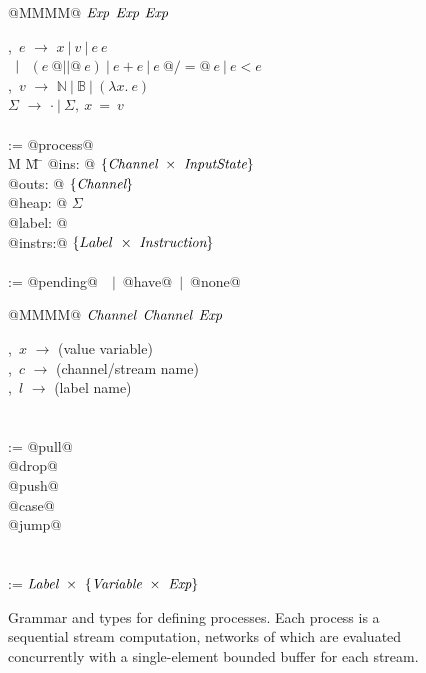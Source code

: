 
\begin{figure}
\begin{minipage}[t]{0.4\textwidth}
\begin{tabbing}
\Instr \TABDEF @MMMM@  \TABSKIP $\textit{Exp}$ \TABSKIP $\textit{Exp}$ \TABSKIP $\textit{Exp}$ \kill

\Exp,~$e$ \> $\to$ \> $x~|~v~|~e~e $ \\
  \> $\enskip|~$ \> $ (e~@||@~e) ~|~ e+e ~|~ e~@/=@~e ~|~ e < e$ \\
\Value,~$v$ \> $\to$ \> $\mathbb{N}~|~\mathbb{B}~|~(\lambda{}x.~e)$ \\
$\Sigma$ \> $\to$ \> $\cdot~|~\Sigma,~x~=~v$ \\
\\

\Proc \>:=\> @process@ \\
M \= M \= \kill
\> \> @ins:   @  $\{\textit{Channel} ~\times~ \textit{InputState}\}$ \\
\> \> @outs:  @  $\{ \textit{Channel} \}$ \\
\> \> @heap:  @  $\Sigma$ \\
\> \> @label: @  \Label \\
\> \> @instrs:@  $\{Label ~\times~ \textit{Instruction}\}$ \\
\\
\Instr \TABDEF \kill
\InputState \> := \> @pending@~\Value~$|$~@have@~$|$~@none@

\end{tabbing}
\end{minipage}
\begin{minipage}[t]{0.05\textwidth}
\quad
\end{minipage}
\begin{minipage}[t]{0.4\textwidth}
\begin{tabbing}
\Instr \TABDEF @MMMM@  \TABSKIP $\textit{Channel}$ \TABSKIP $\textit{Channel}$ \TABSKIP $\textit{Exp}$ \kill

\Var,~$x$ \> $\to$ \> (value variable) \\
\Chan,~$c$ \> $\to$ \> (channel/stream name) \\
\Label,~$l$ \> $\to$ \> (label name) \\
\\
\\

\Instr
    \> :=\> @pull@  \> \Chan  \> \Var  \> \Next \\
    \TABALT @drop@  \> \Chan  \>       \> \Next \\
    \TABALT @push@  \> \Chan  \> \Exp  \> \Next \\
    \TABALT @case@  \> \Exp   \> \Next \> \Next \\
    \TABALT @jump@  \>        \>       \> \Next \\
\\
\\
\Next \> := \> $\textit{Label}~\times~\{\textit{Variable} ~\times~ \textit{Exp}\}$ \\
\end{tabbing}
\end{minipage}

\caption{Grammar and types for defining processes. Each process is a sequential stream computation, networks of which are evaluated concurrently with a single-element bounded buffer for each stream.}
\label{fig:Process:Def}
\end{figure}


